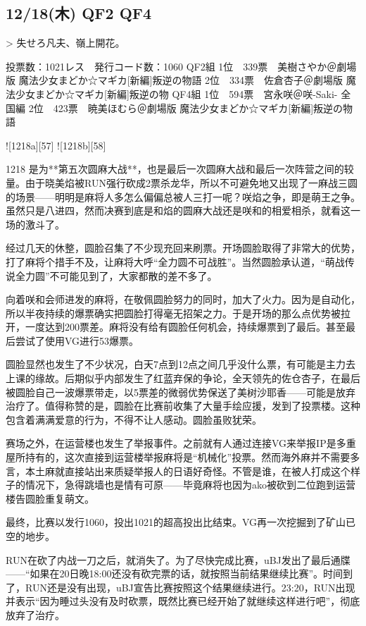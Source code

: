 \subsection{12/18(木) QF2 QF4}

> 失せろ凡夫、嶺上開花。

	投票数：1021レス　発行コード数：1060
	QF2組
	1位　339票　美樹さやか＠劇場版 魔法少女まどか☆マギカ[新編]叛逆の物語
	2位　334票　佐倉杏子＠劇場版 魔法少女まどか☆マギカ[新編]叛逆の物
	QF4組
	1位　594票　宮永咲＠咲-Saki- 全国編
	2位　423票　暁美ほむら＠劇場版 魔法少女まどか☆マギカ[新編]叛逆の物語

![1218a][57]
![1218b][58]

1218 是为**第五次圆麻大战**，也是最后一次圆麻大战和最后一次阵营之间的较量。由于晓美焰被RUN强行砍成2票杀龙华，所以不可避免地又出现了一麻战三圆的场景——明明是麻将人多怎么偏偏总被人三打一呢？咲焰之争，即是萌王之争。虽然只是八进四，然而决赛到底是和焰的圆麻大战还是咲和的相爱相杀，就看这一场的激斗了。

经过几天的休整，圆脸召集了不少现充回来刷票。开场圆脸取得了非常大的优势，打了麻将个措手不及，让麻将大呼“全力圆不可战胜”。当然圆脸承认道，“萌战传说全力圆”不可能见到了，大家都散的差不多了。

向着咲和会师进发的麻将，在敬佩圆脸努力的同时，加大了火力。因为是自动化，所以半夜持续的爆票确实把圆脸打得毫无招架之力。于是开场的那么点优势被拉开，一度达到200票差。麻将没有给有圆脸任何机会，持续爆票到了最后。甚至最后尝试了使用VG进行53爆票。

圆脸显然也发生了不少状况，白天7点到12点之间几乎没什么票，有可能是主力去上课的缘故。后期似乎内部发生了红蓝弃保的争论，全天领先的佐仓杏子，在最后被圆脸自己一波爆票带走，以5票差的微弱优势保送了美树沙耶香——可能是放弃治疗了。值得称赞的是，圆脸在比赛前收集了大量手绘应援，发到了投票楼。这种包含着满满爱意的行为，不得不让人感动。圆脸虽败犹荣。

赛场之外，在运营楼也发生了举报事件。之前就有人通过连接VG来举报IP是多重屋所持有的，这次直接到运营楼举报麻将是“机械化”投票。然而海外麻并不需要多言，本土麻就直接站出来质疑举报人的日语好奇怪。不管是谁，在被人打成这个样子的情况下，急得跳墙也是情有可原——毕竟麻将也因为ako被砍到二位跑到运营楼告圆脸重复萌文。

最终，比赛以发行1060，投出1021的超高投出比结束。VG再一次挖掘到了矿山已空的地步。

RUN在砍了内战一刀之后，就消失了。为了尽快完成比赛，uBJ发出了最后通牒——“如果在20日晚18:00还没有砍完票的话，就按照当前结果继续比赛”。时间到了，RUN还是没有出现，uBJ宣告比赛按照这个结果继续进行。23:20，RUN出现并表示“因为睡过头没有及时砍票，既然比赛已经开始了就继续这样进行吧”，彻底放弃了治疗。

